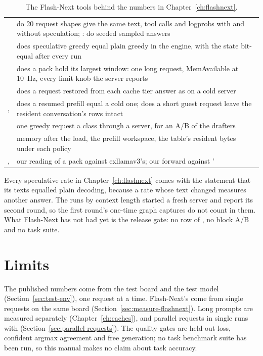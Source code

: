 \begin{table}[htbp]
\centering\small
\caption{The Flash-Next tools behind the numbers in Chapter~\ref{ch:flashnext}.}\label{tab:fn-tools}
\begin{tabularx}{\linewidth}{@{}L{.3\linewidth}Y@{}}
\toprule
{} &  \\
\midrule
{} & do 20 request shapes give the same text, tool calls and logprobs with and without speculation; : do seeded sampled answers \\
 & does speculative greedy equal plain greedy in the engine, with the state bit-equal after every run \\
 & does a pack hold its largest window: one long request, MemAvailable at 10~Hz, every limit knob the server reports \\
 & does a request restored from each cache tier answer as on a cold server \\
,  & does a resumed prefill equal a cold one; does a short guest request leave the resident conversation's rows intact \\
 & one greedy request a class through a server, for an A/B of the drafters \\
 & memory after the load, the prefill workspace, the table's resident bytes under each policy \\
,  & our reading of a pack against exllamav3's; our forward against ' \\
\bottomrule
\end{tabularx}
\end{table}

Every speculative rate in Chapter~\ref{ch:flashnext} comes with the statement that its texts equalled plain decoding, because a rate whose text changed measures another answer. The runs by context length started a fresh server and report its second round, so the first round's one-time graph captures do not count in them. What Flash-Next has not had yet is the release gate: no row of , no block A/B and no task suite.

\section{Limits}

The published numbers come from the test board and the test model (Section~\ref{sec:test-env}), one request at a time. Flash-Next's come from single requests on the same board (Section~\ref{sec:measure-flashnext}). Long prompts are measured separately (Chapter~\ref{ch:caches}), and parallel requests in single runs with  (Section~\ref{sec:parallel-requests}). The quality gates are held-out loss, confident argmax agreement and free generation; no task benchmark suite has been run, so this manual makes no claim about task accuracy.
